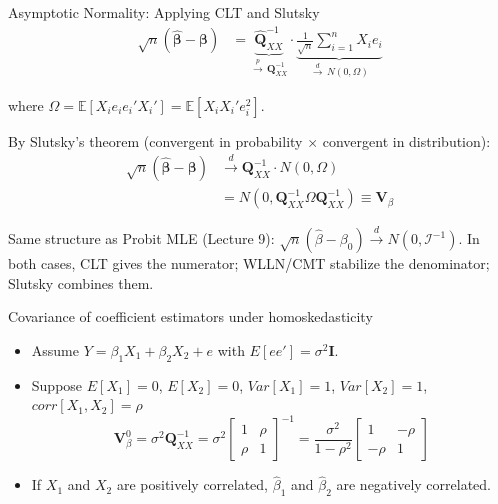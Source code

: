 \documentclass[aspectratio=169, handout, t]{beamer}
\numberwithin{equation}{section}
\begin{document}

\begin{frame}{Asymptotic Normality: Applying CLT and Slutsky}
\begin{align*}
\sqrt{n}(\bm{\hat{\beta}} - \bm{\beta})
&= \underbrace{\bm{\hat{Q}}_{XX}^{-1}}_{\overset{p}{\to}\, \bm{Q}_{XX}^{-1}}
    \cdot \underbrace{\frac{1}{\sqrt{n}} \sum_{i=1}^n X_i e_i}_{\overset{d}{\to}\, N(0, \Omega)}
\end{align*}

\pause

where $\Omega = \mathbb{E}[X_i e_i e_i' X_i'] = \mathbb{E}[X_i X_i' e_i^2]$.

\pause

By Slutsky's theorem (convergent in probability $\times$ convergent in distribution):
\begin{align*}
\sqrt{n}(\bm{\hat{\beta}} - \bm{\beta})
&\xrightarrow{d} \bm{Q}_{XX}^{-1} \cdot N(0, \Omega)
    \tag{4} \\
&= N\left( 0, \bm{Q}_{XX}^{-1} \Omega \bm{Q}_{XX}^{-1} \right)
    \equiv \bm{V}_{\beta}
    \tag{5}
\end{align*}

\pause

\begin{tcolorbox}[colback=blue!5, colframe=blue!50]
Same structure as Probit MLE (Lecture 9): $\sqrt{n}(\hat\beta - \beta_0) \overset{d}{\to} N(0, \mathcal{I}^{-1})$. In both cases, CLT gives the numerator; WLLN/CMT stabilize the denominator; Slutsky combines them.
\end{tcolorbox}

\end{frame}


\begin{frame}{Covariance of coefficient estimators under homoskedasticity}
\begin{itemize}
\item Assume $Y=\beta_1X_1+\beta_2X_2+e$ with $E[ee']=\sigma^2\bm{I}$.
\item Suppose $E[X_1]=0$, $E[X_2]=0$, $Var[X_1]=1$, $Var[X_2]=1$, $corr[X_1, X_2]=\rho$
$$\bm{V}_\beta^0=\sigma^2\bm{Q}_{XX}^{-1}=\sigma^2\begin{bmatrix}1&\rho\\ \rho &1 \end{bmatrix}^{-1}=\frac{\sigma^2}{1-\rho^2}\begin{bmatrix}1&-\rho\\ -\rho &1 \end{bmatrix}$$
\item If $X_1$ and $X_2$ are positively correlated, $\hat{\beta}_1$ and $\hat{\beta}_2$ are negatively correlated.
\end{itemize}
\end{frame}
\end{document}
